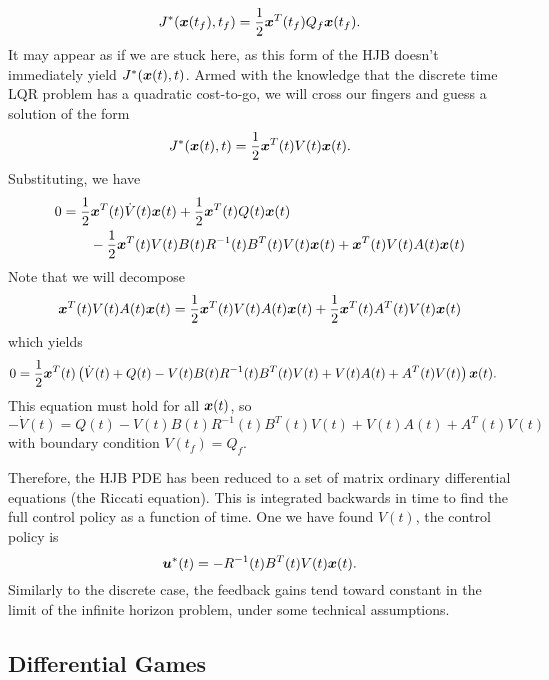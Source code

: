 \begin{equation}
    J^*(\bm{x}(t_f),t_f) = \frac{1}{2} \bm{x}^T(t_f) Q_f \bm{x}(t_f).
\end{equation}
It may appear as if we are stuck here, as this form of the HJB doesn't immediately yield $J^*(\bm{x}(t),t)$. Armed with the knowledge that the discrete time LQR problem has a quadratic cost-to-go, we will cross our fingers and guess a solution of the form
\begin{equation}
    J^*(\bm{x}(t),t) = \frac{1}{2} \bm{x}^T(t) V(t) \bm{x}(t).
\end{equation}
Substituting, we have
\begin{align}
    0 &= \frac{1}{2} \bm{x}^T(t) \dot{V}(t) \bm{x}(t) + \frac{1}{2} \bm{x}^T(t) Q(t) \bm{x}(t)\\ 
    &\qquad- \frac{1}{2} \bm{x}^T(t) V(t) B(t) R^{-1}(t) B^T(t) V(t) \bm{x}(t) + \bm{x}^T(t) V(t) A(t) \bm{x}(t)\nonumber
\end{align}
Note that we will decompose
\begin{equation}
    \bm{x}^T(t) V(t) A(t) \bm{x}(t) = \frac{1}{2} \bm{x}^T(t) V(t) A(t) \bm{x}(t) + \frac{1}{2} \bm{x}^T(t) A^T(t) V(t) \bm{x}(t)
\end{equation}
which yields
\begin{align}
    0 &= \frac{1}{2} \bm{x}^T(t) \left(\dot{V}(t) + Q(t) - V(t) B(t) R^{-1}(t) B^T(t) V(t) + V(t) A(t) + A^T(t) V(t)\right) \bm{x}(t).
\end{align}
This equation must hold for all $\bm{x}(t)$, so 
\begin{equation}
    -\dot{V}(t) = Q(t) - V(t) B(t) R^{-1}(t) B^T(t) V(t) + V(t) A(t) + A^T(t) V(t)
\end{equation}
with boundary condition $V(t_f) = Q_f$.

Therefore, the HJB PDE has been reduced to a set of matrix ordinary differential equations (the Riccati equation). This is integrated backwards in time to find the full control policy as a function of time. One we have found $V(t)$, the control policy is
\begin{equation}
    \bm{u}^*(t) = - R^{-1}(t) B^T(t) V(t) \bm{x}(t).
\end{equation}
Similarly to the discrete case, the feedback gains tend toward constant in the limit of the infinite horizon problem, under some technical assumptions.

\subsection{Differential Games}

